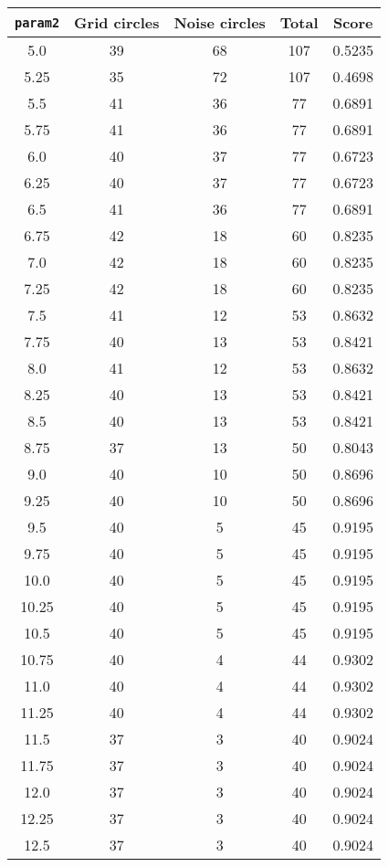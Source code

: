 \documentclass[letterpaper, 12pt]{article}
\begin{document}
\begin{longtable}{|c|c|c|c|c|}
\hline
\textbf{\texttt{param2}} & \textbf{Grid circles} & \textbf{Noise circles} & \textbf{Total} & \textbf{Score} \\
\hline
5.0 & 39 & 68 & 107 & 0.5235 \\
\hline
5.25 & 35 & 72 & 107 & 0.4698 \\
\hline
5.5 & 41 & 36 & 77 & 0.6891 \\
\hline
5.75 & 41 & 36 & 77 & 0.6891 \\
\hline
6.0 & 40 & 37 & 77 & 0.6723 \\
\hline
6.25 & 40 & 37 & 77 & 0.6723 \\
\hline
6.5 & 41 & 36 & 77 & 0.6891 \\
\hline
6.75 & 42 & 18 & 60 & 0.8235 \\
\hline
7.0 & 42 & 18 & 60 & 0.8235 \\
\hline
7.25 & 42 & 18 & 60 & 0.8235 \\
\hline
7.5 & 41 & 12 & 53 & 0.8632 \\
\hline
7.75 & 40 & 13 & 53 & 0.8421 \\
\hline
8.0 & 41 & 12 & 53 & 0.8632 \\
\hline
8.25 & 40 & 13 & 53 & 0.8421 \\
\hline
8.5 & 40 & 13 & 53 & 0.8421 \\
\hline
8.75 & 37 & 13 & 50 & 0.8043 \\
\hline
9.0 & 40 & 10 & 50 & 0.8696 \\
\hline
9.25 & 40 & 10 & 50 & 0.8696 \\
\hline
9.5 & 40 & 5 & 45 & 0.9195 \\
\hline
9.75 & 40 & 5 & 45 & 0.9195 \\
\hline
10.0 & 40 & 5 & 45 & 0.9195 \\
\hline
10.25 & 40 & 5 & 45 & 0.9195 \\
\hline
10.5 & 40 & 5 & 45 & 0.9195 \\
\hline
10.75 & 40 & 4 & 44 & 0.9302 \\
\hline
11.0 & 40 & 4 & 44 & 0.9302 \\
\hline
11.25 & 40 & 4 & 44 & 0.9302 \\
\hline
11.5 & 37 & 3 & 40 & 0.9024 \\
\hline
11.75 & 37 & 3 & 40 & 0.9024 \\
\hline
12.0 & 37 & 3 & 40 & 0.9024 \\
\hline
12.25 & 37 & 3 & 40 & 0.9024 \\
\hline
12.5 & 37 & 3 & 40 & 0.9024 \\

\end{longtable}
\end{document}

